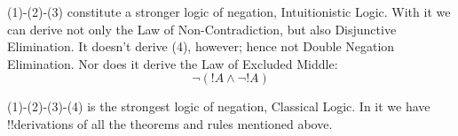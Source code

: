 \documentclass[../../../../include/open-logic-section]{subfiles}
\begin{document}
(1)-(2)-(3) constitute a stronger logic of negation, Intuitionistic Logic. 
With it we can derive not only the Law of Non-Contradiction, but 
also Disjunctive Elimination. It doesn't derive (4), 
however; hence not Double Negation Elimination. Nor does it derive
the Law of Excluded Middle: 
\begin{equation}\tag{Law of Excluded Middle}
    \lnot(!A\land\lnot!A)
\end{equation}

(1)-(2)-(3)-(4) is the strongest logic of negation, Classical Logic.
In it we have !!{derivation}s of all the theorems and rules mentioned
above.
\end{document}
